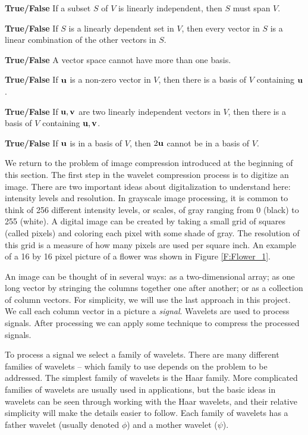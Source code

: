 \item \textbf{True/False} If a subset $S$ of $V$ is linearly independent, then $S$ must span $V$. 

\item \textbf{True/False} If $S$ is a linearly dependent set in $V$, then every vector in $S$ is a linear combination of the other vectors in $S$. 

\item \textbf{True/False} A vector space cannot have more than one basis.

\item \textbf{True/False} If $\mathbf{u}$ is a non-zero vector in $V$, then there is a basis of $V$ containing $\mathbf{u}$.

\item \textbf{True/False} If $\mathbf{u}, \mathbf{v}$ are two linearly independent vectors in $V$, then there is a basis of $V$ containing $\mathbf{u}, \mathbf{v}$. 

\item \textbf{True/False} If $\mathbf{u}$ is in a basis of $V$, then $2\mathbf{u}$ cannot be in a basis of $V$.

\ea	

\ee


We return to the problem of image compression introduced at the beginning of this section. The first step in the wavelet compression process is to digitize an image. There are two important ideas about digitalization to understand here:  intensity levels and resolution.  In grayscale image processing, it is common to think of 256 different intensity levels, or scales, of gray ranging from 0 (black) to 255 (white).  A digital image can be created by taking a small grid of squares (called pixels) and coloring each pixel with some shade of gray.  The resolution of this grid is a measure of how many pixels are used per square inch.  An example of a 16 by 16 pixel picture of a flower was shown in Figure \ref{F:Flower_1}.

An image can be thought of in several ways: as a two-dimensional array; as one long vector by stringing the columns together one after another; or as a collection of column vectors. For simplicity, we will use the last approach in this project. We call each column vector in a picture a \emph{signal}. Wavelets are used to process signals. After processing we can apply some technique to compress the processed signals. 

To process a signal we select a family of wavelets. There are many different families of wavelets -- which family to use depends on the problem to be addressed. The simplest family of wavelets is the Haar family. More complicated families of wavelets are usually used in applications, but the basic ideas in wavelets can be seen through working with the Haar wavelets, and their relative simplicity will make the details easier to follow. Each family of wavelets has a father wavelet (usually denoted $\phi$) and a mother wavelet ($\psi$).

